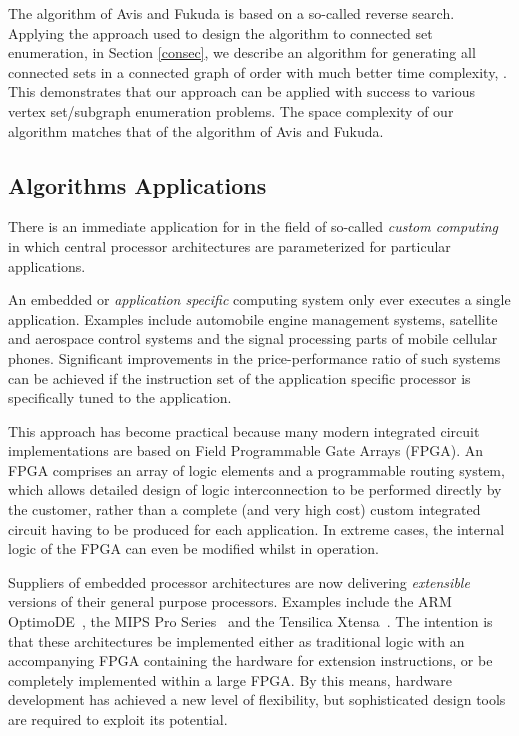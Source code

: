 \documentclass[11pt]{article}
\newcommand{\2}{\vspace{0.2 cm}}
\begin{document}
The algorithm of Avis and Fukuda is based on a so-called reverse
search. Applying the approach used to design the algorithm  to connected
set enumeration, in Section \ref{consec}, we describe an algorithm
 for generating all connected sets in a connected graph 
of order  with much better time complexity, .
This demonstrates that our approach can be applied with success to
various vertex set/subgraph enumeration problems. The space
complexity of our algorithm matches that of the algorithm of Avis
and Fukuda.

\subsection{Algorithms Applications}\label{aasec}

There is an immediate application for  in the field of
so-called {\em custom computing} in which central processor
architectures are parameterized for particular applications.

An embedded or {\em application specific} computing system only ever
executes a single application. Examples include automobile engine
management systems, satellite and aerospace control systems and the
signal processing parts of mobile cellular phones. Significant
improvements in the price-performance ratio of such systems can be
achieved if the instruction set of the application specific
processor is specifically tuned to the application.

This approach has become practical because many modern integrated
circuit implementations are based on Field Programmable Gate Arrays
(FPGA). An FPGA comprises an array of logic elements and a
programmable routing system, which allows detailed design of logic
interconnection to be performed directly by the customer, rather
than a complete (and very high cost) custom integrated circuit
having to be produced for each application. In extreme cases, the
internal logic of the FPGA can even be modified whilst in operation.

Suppliers of embedded processor architectures are now delivering
{\em extensible} versions of their general purpose processors.
Examples include the ARM OptimoDE~\cite{arm}, the MIPS Pro
Series~\cite{mips} and the Tensilica Xtensa~\cite{tens}. The
intention is that these architectures be implemented either as
traditional logic with an accompanying FPGA containing the hardware
for extension instructions, or be completely implemented within a
large FPGA. By this means, hardware development has achieved a new
level of flexibility, but sophisticated design tools are required to
exploit its potential.
\end{document}
